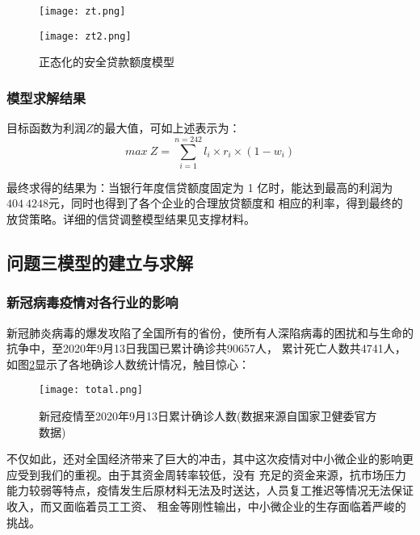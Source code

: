 \documentclass[withoutpreface,bwprint]{cumcmthesis}
\begin{document}
\begin{figure}[H]
    \centering
    \begin{minipage}[c]{0.4\textwidth}
        \raggedright
        \texttt{[image: zt.png]}
        \label{fig:zt}
    \end{minipage}
    \begin{minipage}[c]{0.4\textwidth}
        \raggedleft
        \texttt{[image: zt2.png]}
        \label{fig:zt2}
    \end{minipage}
    \caption{正态化的安全贷款额度模型}
    \label{fig:zt-figure}
\end{figure}

\subsubsection{模型求解结果}
目标函数为利润$Z$的最大值，可如上述表示为：
\begin{equation}
    max\ Z = \sum_{i=1}^{n=242}l_i \times r_i \times (1-w_i)
\end{equation}

最终求得的结果为：当银行年度信贷额度固定为 1 亿时，能达到最高的利润为$404\ 4248$元，同时也得到了各个企业的合理放贷额度和
相应的利率，得到最终的放贷策略。详细的信贷调整模型结果见支撑材料。


\subsection{问题三模型的建立与求解}
\subsubsection{新冠病毒疫情对各行业的影响}
新冠肺炎病毒的爆发攻陷了全国所有的省份，使所有人深陷病毒的困扰和与生命的抗争中，至2020年9月13日我国已累计确诊共90657人，
累计死亡人数共4741人，如图\ref{fig:reliability}显示了各地确诊人数统计情况，触目惊心：
\begin{figure}[!h]
    \centering
    \texttt{[image: total.png]}
    \caption{新冠疫情至2020年9月13日累计确诊人数\newline(数据来源自国家卫健委官方数据)}
    \label{fig:reliability}
\end{figure}

不仅如此，还对全国经济带来了巨大的冲击，其中这次疫情对中小微企业的影响更应受到我们的重视。由于其资金周转率较低，没有
充足的资金来源，抗市场压力能力较弱等特点，疫情发生后原材料无法及时送达，人员复工推迟等情况无法保证收入，而又面临着员工工资、
租金等刚性输出，中小微企业的生存面临着严峻的挑战。
\end{document}
